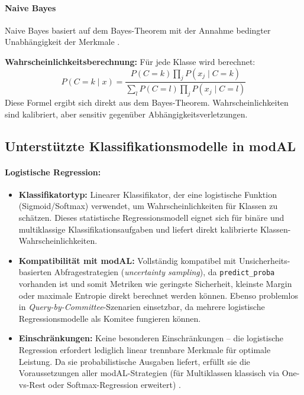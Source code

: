 \documentclass{article}
\begin{document}
\paragraph{Naive Bayes}
Naive Bayes basiert auf dem Bayes-Theorem mit der Annahme bedingter Unabhängigkeit der Merkmale \cite{zhang2004naive}.

\textbf{Wahrscheinlichkeitsberechnung:} Für jede Klasse wird berechnet:
\[ P(C=k \mid x) = \frac{P(C=k) \prod_j P(x_j \mid C=k)}{\sum_{l} P(C=l) \prod_j P(x_j \mid C=l)} \]
Diese Formel ergibt sich direkt aus dem Bayes-Theorem. Wahrscheinlichkeiten sind kalibriert, aber sensitiv gegenüber Abhängigkeitsverletzungen\cite{Gohari2023}.
\subsection{Unterstützte Klassifikationsmodelle in modAL}

\paragraph{Logistische Regression:}
\begin{itemize}
	\item \textbf{Klassifikatortyp:} Linearer Klassifikator, der eine logistische Funktion (Sigmoid/Softmax) verwendet, um Wahrscheinlichkeiten für Klassen zu schätzen. Dieses statistische Regressionsmodell eignet sich für binäre und multiklassige Klassifikationsaufgaben und liefert direkt kalibrierte Klassen-Wahrscheinlichkeiten.
	\item \textbf{Kompatibilität mit modAL:} Vollständig kompatibel mit Unsicherheits-basierten Abfragestrategien (\emph{uncertainty sampling}), da \texttt{predict\_proba} vorhanden ist und somit Metriken wie geringste Sicherheit, kleinste Margin oder maximale Entropie direkt berechnet werden können. Ebenso problemlos in \emph{Query-by-Committee}-Szenarien einsetzbar, da mehrere logistische Regressionsmodelle als Komitee fungieren können.
	\item \textbf{Einschränkungen:} Keine besonderen Einschränkungen – die logistische Regression erfordert lediglich linear trennbare Merkmale für optimale Leistung. Da sie probabilistische Ausgaben liefert, erfüllt sie die Voraussetzungen aller modAL-Strategien (für Multiklassen klassisch via One-vs-Rest oder Softmax-Regression erweitert)
	\cite{Dreiseitl2002}.
\end{itemize}
\end{document}
